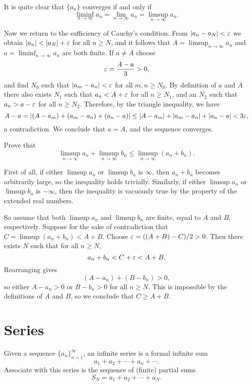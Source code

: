 It is quite clear that $\{a_n\}$ converges if and only if $$\liminf_{n \rightarrow \infty} a_n=\lim_{n \rightarrow \infty}a_n=\limsup_{n \rightarrow \infty}a_n.$$

Now we return to the sufficiency of Cauchy's condition. From $\lvert a_n-a_N \rvert<\varepsilon$ we obtain $\lvert a_n \rvert<\lvert a_N \rvert+\varepsilon$ for all $n \ge N$, and it follows that $A=\limsup_{n \rightarrow \infty}a_n$ and $a=\liminf_{n \rightarrow \infty}a_n$ are both finite. If $a \neq A$ choose $$\varepsilon=\dfrac{A-a}{3}>0,$$ and find $N_0$ such that $\lvert a_m-a_n \rvert<\varepsilon$ for all $m,n \ge N_0$. By definition of $a$ and $A$ there also exists $N_1$ such that $a_n<A+\varepsilon$ for all $n \ge N_1$, and an $N_2$ such that $a_n>a-\varepsilon$ for all $n \ge N_2$. Therefore, by the triangle inequality, we have $$A-a=\lvert (A-a_m)+(a_m-a_n)+(a_n-a) \rvert \le \lvert A-a_m \rvert+\lvert a_m-a_n \rvert+\lvert a_n-a \rvert<3\varepsilon,$$ a contradiction. We conclude that $a=A$, and the sequence converges.

\begin{exercise}
	Prove that $$\limsup_{n \rightarrow \infty}a_n+\limsup_{n \rightarrow \infty} b_n \le \limsup_{n \rightarrow \infty} (a_n+b_n).$$
	
	\begin{sol}
		First of all, if either $\limsup a_n$ or $\limsup b_n$ is $\infty$, then $a_n+b_n$ becomes arbitrarily large, so the inequality holds trivially. Similarly, if either $\limsup a_n$ or $\limsup b_n$ is $-\infty$, then the inequality is vacuously true by the property of the extended real numbers.
		
		So assume that both $\limsup a_n$ and $\limsup b_n$ are finite, equal to $A$ and $B$, respectively. Suppose for the sake of contradiction that $C=\limsup (a_n+b_n)<A+B$. Choose $\varepsilon=((A+B)-C)/2>0$. Then there exists $N$ such that for all $n \ge N$, $$a_n+b_n<C+\varepsilon<A+B.$$ Rearranging gives $$(A-a_n)+(B-b_n)>0,$$ so either $A-a_n>0$ or $B-b_n>0$ for all $n \ge N$. This is impossible by the definitions of $A$ and $B$, so we conclude that $C \ge A+B$.
	\end{sol}
\end{exercise}

\section{Series}
Given a sequence $\{a_n\}_{n=1}^{\infty}$, an infinite series is a formal infinite sum $$a_1+a_2+\cdots+a_n+\cdots.$$ Associate with this series is the sequence of (finite) partial sums $$S_N=a_1+a_2+\cdots+a_N.$$

